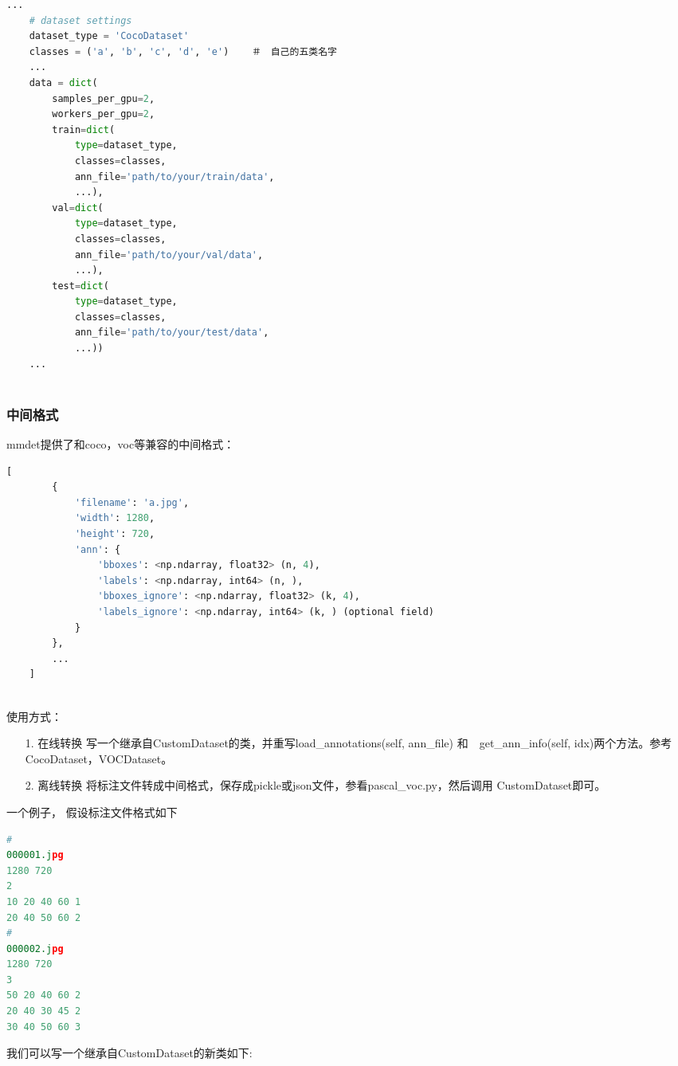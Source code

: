 \documentclass[UTF8]{ctexart}
\begin{document}
\lstset{style=mystyle}
\begin{lstlisting}[language=Python]
	...
	# dataset settings
	dataset_type = 'CocoDataset'
	classes = ('a', 'b', 'c', 'd', 'e')    ＃　自己的五类名字
	...
	data = dict(
		samples_per_gpu=2,
		workers_per_gpu=2,
		train=dict(
			type=dataset_type,
			classes=classes,
			ann_file='path/to/your/train/data',
			...),
		val=dict(
			type=dataset_type,
			classes=classes,
			ann_file='path/to/your/val/data',
			...),
		test=dict(
			type=dataset_type,
			classes=classes,
			ann_file='path/to/your/test/data',
			...))
	...
	
\end{lstlisting}

\subsubsection{中间格式}
mmdet提供了和coco，voc等兼容的中间格式：
\lstset{style=mystyle}
\begin{lstlisting}[language=Python]
	[
		{
			'filename': 'a.jpg',
			'width': 1280,
			'height': 720,
			'ann': {
				'bboxes': <np.ndarray, float32> (n, 4),
				'labels': <np.ndarray, int64> (n, ),
				'bboxes_ignore': <np.ndarray, float32> (k, 4),
				'labels_ignore': <np.ndarray, int64> (k, ) (optional field)
			}
		},
		...
	]
	
\end{lstlisting}

使用方式：
　\begin{itemize}
	\item[1.] 在线转换
		\newline
		 写一个继承自CustomDataset的类，并重写load\_annotations(self, ann\_file) 
		和　get\_ann\_info(self, idx)两个方法。参考CocoDataset，VOCDataset。

	\item[2.] 离线转换 
		\newline
		将标注文件转成中间格式，保存成pickle或json文件，参看pascal\_voc.py，然后调用
		CustomDataset即可。

\end{itemize}
一个例子，
假设标注文件格式如下
\lstset{style=mystyle}
\begin{lstlisting}[language=Python]
#
000001.jpg
1280 720
2
10 20 40 60 1
20 40 50 60 2
#
000002.jpg
1280 720
3
50 20 40 60 2
20 40 30 45 2
30 40 50 60 3
\end{lstlisting}

我们可以写一个继承自CustomDataset的新类如下:
\end{document}

